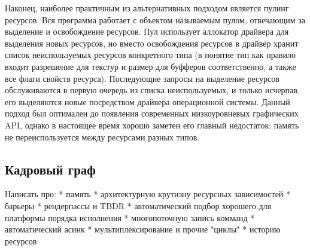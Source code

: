 Наконец, наиболее практичным из альтернативных подходом является пулинг ресурсов. Вся программа работает с объектом называемым пулом, отвечающим за выделение и освобождение ресурсов. Пул использует аллокатор драйвера для выделения новых ресурсов, но вместо освобождения ресурсов в драйвер хранит список неиспользуемых ресурсов конкретного типа (в понятие тип как правило входит разрешение для текстур и размер для буфферов соответственно, а также все флаги свойств ресурса). Последующие запросы на выделение ресурсов обслуживаются в первую очередь из списка неиспользуемых, и только исчерпав его выделяются новые посредством драйвера операционной системы. Данный подход был оптимален до появления современных низкоуровневых графических API, однако в настоящее время хорошо заметен его главный недостаток: память не переиспользуется между ресурсами разных типов.

\subsection{Кадровый граф}
Написать про:
* память
* архитектурную крутизну ресурсных зависимостей
* барьеры
* рендерпассы и TBDR
* автоматический подбор хорошего для платформы порядка исполнения
* многопоточную запись комманд
* автоматический асинк
* мультиплексирование и прочие "циклы"
* историю ресурсов
